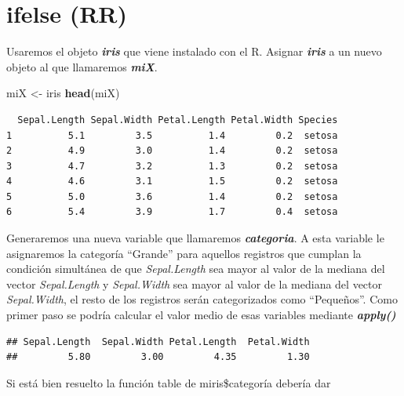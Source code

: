 \documentclass[]{book}
\newenvironment{Shaded}{\begin{snugshade}}{\end{snugshade}}
\newcommand{\KeywordTok}[1]{\textcolor[rgb]{0.13,0.29,0.53}{\textbf{#1}}}
\newcommand{\NormalTok}[1]{#1}
\newcommand{\OperatorTok}[1]{\textcolor[rgb]{0.81,0.36,0.00}{\textbf{#1}}}
\newcommand{\StringTok}[1]{\textcolor[rgb]{0.31,0.60,0.02}{#1}}
\begin{document}
\hypertarget{ifelse-rr}{%
\section{ifelse (RR)}\label{ifelse-rr}}

Usaremos el objeto \textbf{\emph{iris}} que viene instalado con el R. Asignar \textbf{\emph{iris}} a un nuevo objeto al que llamaremos \textbf{\emph{miX}}.

\begin{Shaded}
\begin{Highlighting}[]
\NormalTok{miX <-}\StringTok{ }\NormalTok{iris}
\KeywordTok{head}\NormalTok{(miX)}
\end{Highlighting}
\end{Shaded}

\begin{verbatim}
  Sepal.Length Sepal.Width Petal.Length Petal.Width Species
1          5.1         3.5          1.4         0.2  setosa
2          4.9         3.0          1.4         0.2  setosa
3          4.7         3.2          1.3         0.2  setosa
4          4.6         3.1          1.5         0.2  setosa
5          5.0         3.6          1.4         0.2  setosa
6          5.4         3.9          1.7         0.4  setosa
\end{verbatim}

Generaremos una nueva variable que llamaremos \textbf{\emph{categoria}}. A esta variable le asignaremos la categoría ``Grande'' para aquellos registros que cumplan la condición simultánea de que \emph{Sepal.Length} sea mayor al valor de la mediana del vector \emph{Sepal.Length} y \emph{Sepal.Width} sea mayor al valor de la mediana del vector \emph{Sepal.Width}, el resto de los registros serán categorizados como ``Pequeños''. Como primer paso se podría calcular el valor medio de esas variables mediante \textbf{\emph{apply()}}

\begin{verbatim}
## Sepal.Length  Sepal.Width Petal.Length  Petal.Width 
##         5.80         3.00         4.35         1.30
\end{verbatim}

Si está bien resuelto la función table de miris\$categoría debería dar

\begin{Shaded}
\end{Shaded}
\end{document}
